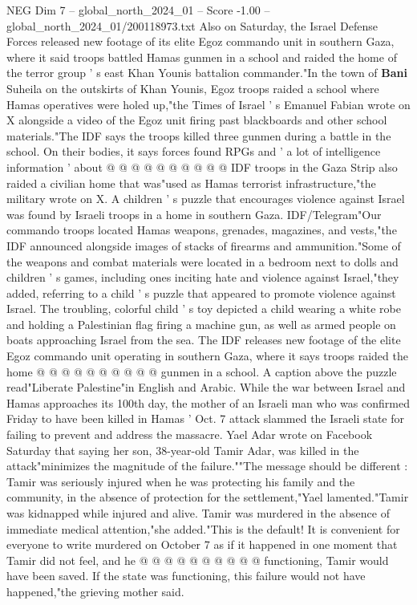 \begin{textsample}{NEG Dim 7 – global\_north\_2024\_01 – Score -1.00 – global\_north\_2024\_01/200118973.txt}
Also on Saturday, the Israel Defense Forces released new footage of its elite Egoz commando unit in southern Gaza, where it said troops battled Hamas gunmen in a school and raided the home of the terror group ' s east Khan Younis battalion commander."In the town of \textbf{Bani} Suheila on the outskirts of Khan Younis, Egoz troops raided a school where Hamas operatives were holed up,"the Times of Israel ' s Emanuel Fabian wrote on X alongside a video of the Egoz unit firing past blackboards and other school materials."The IDF says the troops killed three gunmen during a battle in the school.
On their bodies, it says forces found RPGs and ' a lot of intelligence information ' about @ @ @ @ @ @ @ @ @ @ IDF troops in the Gaza Strip also raided a civilian home that was"used as Hamas terrorist infrastructure,"the military wrote on X.
A children ' s puzzle that encourages violence against Israel was found by Israeli troops in a home in southern Gaza.
IDF/Telegram"Our commando troops located Hamas weapons, grenades, magazines, and vests,"the IDF announced alongside images of stacks of firearms and ammunition."Some of the weapons and combat materials were located in a bedroom next to dolls and children ' s games, including ones inciting hate and violence against Israel,"they added, referring to a child ' s puzzle that appeared to promote violence against Israel.
The troubling, colorful child ' s toy depicted a child wearing a white robe and holding a Palestinian flag firing a machine gun, as well as armed people on boats approaching Israel from the sea.
The IDF releases new footage of the elite Egoz commando unit operating in southern Gaza, where it says troops raided the home @ @ @ @ @ @ @ @ @ @ gunmen in a school.
A caption above the puzzle read"Liberate Palestine"in English and Arabic.
While the war between Israel and Hamas approaches its 100th day, the mother of an Israeli man who was confirmed Friday to have been killed in Hamas ' Oct. 7 attack slammed the Israeli state for failing to prevent and address the massacre.
Yael Adar wrote on Facebook Saturday that saying her son, 38-year-old Tamir Adar, was killed in the attack"minimizes the magnitude of the failure.""The message should be different : Tamir was seriously injured when he was protecting his family and the community, in the absence of protection for the settlement,"Yael lamented."Tamir was kidnapped while injured and alive.
Tamir was murdered in the absence of immediate medical attention,"she added."This is the default!
It is convenient for everyone to write murdered on October 7 as if it happened in one moment that Tamir did not feel, and he @ @ @ @ @ @ @ @ @ @ functioning, Tamir would have been saved.
If the state was functioning, this failure would not have happened,"the grieving mother said.

\end{textsample}
